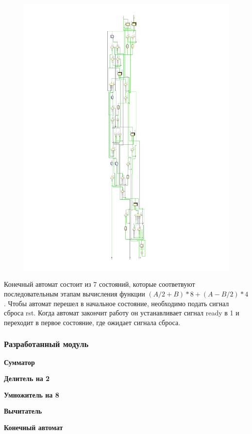 \documentclass[12pt,onecolumn]{article}
\begin{document}
\begin{figure}
    \includegraphics[]{image/fsm-schema.pdf}
\end{figure}

Конечный автомат состоит из 7 состояний, которые соответвуют последовательным этапам вычисления функции $(A/2+B)*8 + (A-B/2)*4$.
Чтобы автомат перешел в начальное состояние, необходимо подать сигнал сброса rst.
Когда автомат закончит работу он устанавливает сигнал ready в 1 и переходит в первое состояние, где ожидает сигнала сброса.
\subsubsection{Разработанный модуль}
\textbf{Сумматор}

\textbf{Делитель на 2}

\textbf{Умножитель на 8}

\textbf{Вычитатель}

\textbf{Конечный автомат}

\end{document}
